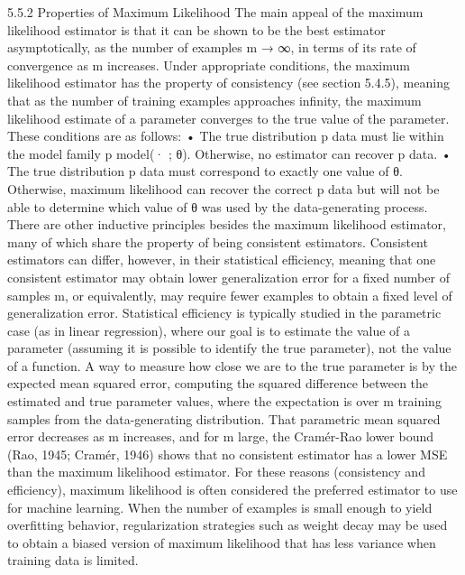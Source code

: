 \documentclass[11pt]{article}
\begin{document}
5.5.2 Properties of Maximum Likelihood
The main appeal of the maximum likelihood estimator is that it can be shown to
be the best estimator asymptotically, as the number of examples m → ∞, in terms of its rate of convergence as m increases.
Under appropriate conditions, the maximum likelihood estimator has the property of consistency (see section 5.4.5), meaning that as the number of training examples approaches inﬁnity, the maximum likelihood estimate of a parameter converges to the true value of the parameter.
These conditions are as follows:
• The true distribution p data must lie within the model family p model(· ; θ).
Otherwise, no estimator can recover p data.
• The true distribution p data must correspond to exactly one value of θ.
Otherwise, maximum likelihood can recover the correct p data but will not be able to determine which value of θ was used by the data-generating process.
There are other inductive principles besides the maximum likelihood estimator, many of which share the property of being consistent estimators.
Consistent estimators can diﬀer, however, in their statistical eﬃciency, meaning that one consistent estimator may obtain lower generalization error for a ﬁxed number of samples m, or equivalently, may require fewer examples to obtain a ﬁxed level of generalization error.
Statistical eﬃciency is typically studied in the parametric case (as in linear regression), where our goal is to estimate the value of a parameter (assuming it is possible to identify the true parameter), not the value of a function.
A way to measure how close we are to the true parameter is by the expected mean squared error, computing the squared diﬀerence between the estimated and true parameter values, where the expectation is over m training samples from the data-generating distribution.
That parametric mean squared error decreases as m increases, and for m large, the Cramér-Rao lower bound (Rao, 1945; Cramér, 1946) shows that no consistent estimator has a lower MSE than the maximum likelihood estimator.
For these reasons (consistency and eﬃciency), maximum likelihood is often considered the preferred estimator to use for machine learning.
When the number of examples is small enough to yield overﬁtting behavior, regularization strategies such as weight decay may be used to obtain a biased version of maximum likelihood that has less variance when training data is limited.
\end{document}
